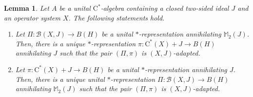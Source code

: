 \documentclass[10pt]{amsart}
\newcommand{\bM}{{\mathbb{M}}}
\newcommand{\B}{{\mathcal{B}}}
\newcommand{\rC}{\mathrm{C}}
\newtheorem{lemma}{Lemma}[section]
\theoremstyle{definition}
\begin{document}
\begin{lemma}\label{L:singrep}
Let $A$ be a unital $\rC^*$-algebra containing a closed two-sided ideal $J$ and an operator system $X$. The following statements hold.
\begin{enumerate}[{\rm (i)}]
\item Let $\Pi:\B(X,J)\to B(H)$ be a unital $*$-representation annihilating $\bM_2(J)$.
Then, there is a unique $*$-representation $\pi:\rC^*(X)+J\to B(H)$ annihilating $J$ such that the pair $(\Pi,\pi)$ is $(X,J)$-adapted.

\item Let $\pi:\rC^*(X)+J\to B(H)$ be a unital $*$-representation annihilating $J$. Then, there is a unique unital $*$-representation $\Pi:\B(X,J)\to B(H)$ annihilating $\bM_2(J)$ such that the pair $(\Pi,\pi)$ is $(X,J)$-adapted.
\end{enumerate}

\end{lemma}
\end{document}
